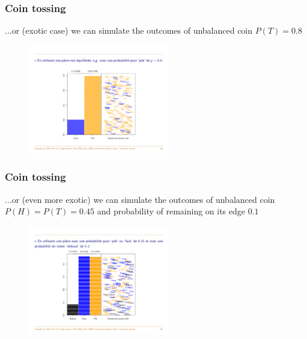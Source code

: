 \documentclass[notes=show,smaller,handout]{beamer}\usepackage[]{graphicx}\usepackage[]{color}
\begin{document}
\begin{frame}
\frametitle{Coin tossing}

...or (exotic case) we can simulate the outcomes of unbalanced coin $P(T)=0.8$

\begin{center} %
\begin{figure}[ptb]\centering
\includegraphics[width=0.55\textwidth,height=0.6\textheight]{img/sim7.pdf}
\end{figure}
\end{center}



\end{frame}


\begin{frame}
\frametitle{Coin tossing}

...or (even more exotic) we can simulate the outcomes of unbalanced coin $P(H)=P(T)=0.45$ and probability of remaining
 on its edge $0.1$


\begin{center} %
\begin{figure}[ptb]\centering
\includegraphics[width=0.55\textwidth,height=0.6\textheight]{img/sim8.pdf}
\end{figure}
\end{center}



\end{frame}
\end{document}
